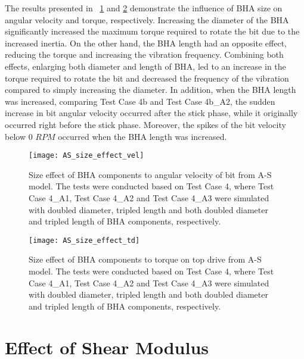 The results presented in \figurename~\ref{figure_AS_BHA_size_effect_vel} and \ref{figure_AS_BHA_size_effect_td} demonstrate the influence of BHA size on angular velocity and torque, respectively. Increasing the diameter of the BHA significantly increased the maximum torque required to rotate the bit due to the increased inertia. On the other hand, the BHA length had an opposite effect, reducing the torque and increasing the vibration frequency. Combining both effects, enlarging both diameter and length of BHA, led to an increase in the torque required to rotate the bit and decreased the frequency of the vibration compared to simply increasing the diameter. In addition, when the BHA length was increased, comparing Test Case 4b and Test Case 4b\_A2, the sudden increase in bit angular velocity occurred after the stick phase, while it originally occurred right before the stick phase. Moreover, the spikes of the bit velocity below 0 $RPM$ occurred when the BHA length was increased.
\begin{figure}
  \centering
  \texttt{[image: AS\_size\_effect\_vel]}
  \caption[Size effect of BHA components to angular velocity from A-S model]{Size effect of BHA components to angular velocity of bit from A-S model. The tests were conducted based on Test Case 4, where Test Case 4\_A1, Test Case 4\_A2 and Test Case 4\_A3 were simulated with doubled diameter, tripled length and both doubled diameter and tripled length of BHA components, respectively.}\label{figure_AS_BHA_size_effect_vel}
\end{figure}

\begin{figure}
  \centering
  \texttt{[image: AS\_size\_effect\_td]}
  \caption[Size effect of BHA components to a torque from A-S model]{Size effect of BHA components to torque on top drive from A-S model. The tests were conducted based on Test Case 4, where Test Case 4\_A1, Test Case 4\_A2 and Test Case 4\_A3 were simulated with doubled diameter, tripled length and both doubled diameter and tripled length of BHA components, respectively.}\label{figure_AS_BHA_size_effect_td}
\end{figure}

\section{Effect of Shear Modulus} 
